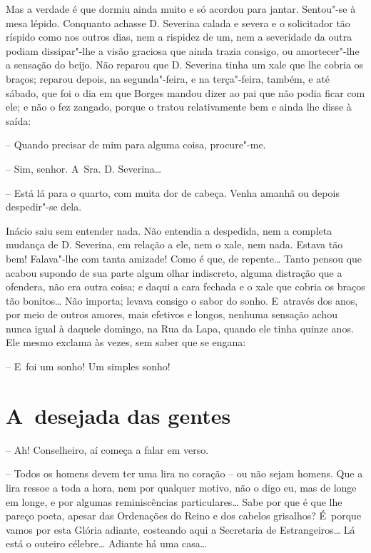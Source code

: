 Mas a verdade é que dormiu ainda muito e só acordou para jantar.
Sentou"-se à mesa lépido. Conquanto achasse D. Severina calada e severa e
o solicitador tão ríspido como nos outros dias, nem a rispidez de um,
nem a severidade da outra podiam dissipar"-lhe a visão graciosa que ainda
trazia consigo, ou amortecer"-lhe a sensação do beijo. Não reparou que D.
Severina tinha um xale que lhe cobria os braços; reparou depois, na
segunda"-feira, e na terça"-feira, também, e até sábado, que foi o dia em
que Borges mandou dizer ao pai que não podia ficar com ele; e não o fez
zangado, porque o tratou relativamente bem e ainda lhe disse à saída:

-- Quando precisar de mim para alguma coisa, procure"-me.

-- Sim, senhor. A~Sra. D. Severina\ldots{}

-- Está lá para o quarto, com muita dor de cabeça. Venha amanhã ou
depois despedir"-se dela.

Inácio saiu sem entender nada. Não entendia a despedida, nem a completa
mudança de D. Severina, em relação a ele, nem o xale, nem nada. Estava
tão bem! Falava"-lhe com tanta amizade! Como é que, de repente\ldots{} Tanto
pensou que acabou supondo de sua parte algum olhar indiscreto, alguma
distração que a ofendera, não era outra coisa; e daqui a cara fechada e
o xale que cobria os braços tão bonitos\ldots{} Não importa; levava consigo o
sabor do sonho. E~através dos anos, por meio de outros amores, mais
efetivos e longos, nenhuma sensação achou nunca igual à daquele domingo,
na Rua da Lapa, quando ele tinha quinze anos. Ele mesmo exclama às
vezes, sem saber que se engana:\nopagebreak

-- E~foi um sonho! Um simples sonho!

\chapter{A~desejada das gentes}

-- Ah! Conselheiro, aí começa a falar em verso.

-- Todos os homens devem ter uma lira no coração -- ou não sejam homens.
Que a lira ressoe a toda a hora, nem por qualquer motivo, não o digo eu,
mas de longe em longe, e por algumas reminiscências particulares\ldots{} Sabe
por que é que lhe pareço poeta, apesar das Ordenações do Reino e dos
cabelos grisalhos? É~porque vamos por esta Glória adiante, costeando
aqui a Secretaria de Estrangeiros\ldots{} Lá está o outeiro célebre\ldots{}
Adiante há uma casa\ldots{}


